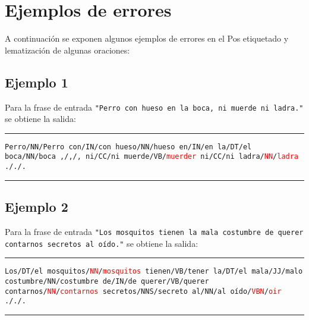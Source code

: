 \section{Ejemplos de errores}
A continuación se exponen algunos ejemplos de errores en el Pos etiquetado y lematización de \newline algunas oraciones: 
\subsection*{Ejemplo 1}
Para la frase de entrada \texttt{"Perro con hueso en la boca, ni muerde ni ladra."} se obtiene la salida: \newline

\noindent\rule{14cm}{0.4pt}\newline
\texttt{Perro/NN/Perro\newline
con/IN/con\newline
hueso/NN/hueso\newline
en/IN/en\newline
la/DT/el\newline
boca/NN/boca\newline
,/,/,\newline
ni/CC/ni\newline
muerde/VB/\textcolor{red}{muerder}\newline
ni/CC/ni\newline
ladra/\textcolor{red}{NN}/\textcolor{red}{ladra}\newline
././.\newline
}
\noindent\rule{14cm}{0.4pt}\newline
\subsection*{Ejemplo 2}
Para la frase de entrada \texttt{"Los mosquitos tienen la mala costumbre de querer contarnos secretos al oído."} se obtiene la salida: \newline
\noindent\rule{14cm}{0.4pt}\newline
\texttt{Los/DT/el\newline
mosquitos/\textcolor{red}{NN}/\textcolor{red}{mosquitos}\newline
tienen/VB/tener\newline
la/DT/el\newline
mala/JJ/malo\newline
costumbre/NN/costumbre\newline
de/IN/de\newline
querer/VB/querer\newline
contarnos/\textcolor{red}{NN}/\textcolor{red}{contarnos}\newline
secretos/NNS/secreto\newline
al/NN/al\newline
oído/\textcolor{red}{VBN}/\textcolor{red}{oir}\newline
././.\newline
}
\noindent\rule{14cm}{0.4pt}\newline
